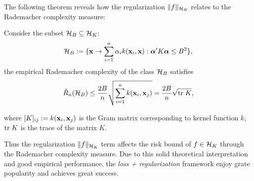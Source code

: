 The following theorem reveals how the regularization $\|f\|_{{\cal H}_K}$ relates to the
Rademacher complexity measure:
\begin{lemma}  \label{lemma:rdm-is-bounded}
Consider the subset ${\cal H}_B \subseteq {\cal H}_K$:
\[
{\cal H}_B := \{\mathbf{x} \rightarrow \sum_{i=1}^n {\alpha}_ik(\mathbf{x}_i, \mathbf{x}): \boldsymbol{{\alpha}}'K\boldsymbol{{\alpha}} \leq B^2 \},
\]
the empirical Rademacher complexity of the class ${\cal H}_B$ satisfies
\[
\hat{R}_n({\cal H}_B) \leq \frac{2B}{n} \sqrt{\sum_{i=1}^n k(\mathbf{x}_i, \mathbf{x}_j)} = \frac{2B}{n} \sqrt{{\mbox{tr}\;} K},
\]
\end{lemma}
where $[K]_{ij} := k(\mathbf{x}_i, \mathbf{x}_j)$ is the Gram matrix corresponding to
kernel function $k$, ${\mbox{tr}\;} K$ is the trace of the matrix $K$.

Thus the regularization $\|f\|_{{\cal H}_K}$ term affects the risk bound of $f \in {\cal H}_K$
through the Rademacher complexity measure. Due to this solid theoretical
interpretation and good empirical performance, the {\em loss + regularization}
framework enjoy grate popularity and achieves great success.

